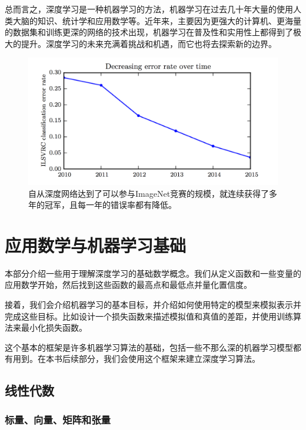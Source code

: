 \documentclass[a4paper,11pt]{book}
\begin{document}
总而言之，深度学习是一种机器学习的方法，机器学习在过去几十年大量的使用人类大脑的知识、统计学和应用数学等。近年来，主要因为更强大的计算机、更海量的数据集和训练更深的网络的技术出现，机器学习在普及性和实用性上都得到了极大的提升。深度学习的未来充满着挑战和机遇，而它也将去探索新的边界。

   

	

\begin{figure}[htbp] %
   \centering
   \includegraphics[width=6in]{fig/chap1/1.12.png} 
   \caption{自从深度网络达到了可以参与ImageNet竞赛的规模，就连续获得了多年的冠军，且每一年的错误率都有降低。}
   \label{fig:1.12}
\end{figure}


\part{应用数学与机器学习基础}
\label{part:1}

本部分介绍一些用于理解深度学习的基础数学概念。我们从定义函数和一些变量的应用数学开始，然后找到这些函数的最高点和最低点并量化置信度。


接着，我们会介绍机器学习的基本目标，并介绍如何使用特定的模型来模拟表示并完成这些目标。比如设计一个损失函数来描述模拟值和真值的差距，并使用训练算法来最小化损失函数。


这个基本的框架是许多机器学习算法的基础，包括一些不那么深的机器学习模型都有用到。在本书后续部分，我们会使用这个框架来建立深度学习算法。

\chapter{线性代数}
\label{chap:2}

\section{标量、向量、矩阵和张量}
\label{sec:2.1}
\end{document}
